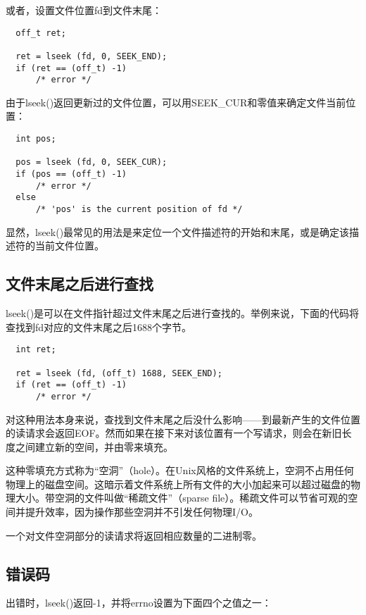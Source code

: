 或者，设置文件位置fd到文件末尾： 

\begin{lstlisting}
  off_t ret;

  ret = lseek (fd, 0, SEEK_END);
  if (ret == (off_t) -1)
      /* error */
\end{lstlisting}

由于lseek()返回更新过的文件位置，可以用SEEK\_CUR和零值来确定文件当前位置：

\begin{lstlisting}
  int pos;

  pos = lseek (fd, 0, SEEK_CUR);
  if (pos == (off_t) -1)
      /* error */
  else
      /* 'pos' is the current position of fd */
\end{lstlisting}

显然，lseek()最常见的用法是来定位一个文件描述符的开始和末尾，或是确定该描述符的当前文件位置。 

\subsection{文件末尾之后进行查找}

lseek()是可以在文件指针超过文件末尾之后进行查找的。举例来说，下面的代码将查找到fd对应的文件末尾之后1688个字节。 

\begin{lstlisting}
  int ret;

  ret = lseek (fd, (off_t) 1688, SEEK_END);
  if (ret == (off_t) -1)
      /* error */
\end{lstlisting}

对这种用法本身来说，查找到文件末尾之后没什么影响——到最新产生的文件位置的读请求会返回EOF。然而如果在接下来对该位置有一个写请求，则会在新旧长度之间建立新的空间，并由零来填充。

这种零填充方式称为“空洞”（hole）。在Unix风格的文件系统上，空洞不占用任何物理上的磁盘空间。这暗示着文件系统上所有文件的大小加起来可以超过磁盘的物理大小。带空洞的文件叫做“稀疏文件”（sparse file）。稀疏文件可以节省可观的空间并提升效率，因为操作那些空洞并不引发任何物理I/O。

一个对文件空洞部分的读请求将返回相应数量的二进制零。 

\subsection{错误码}

出错时，lseek()返回-1，并将errno设置为下面四个之值之一： 

